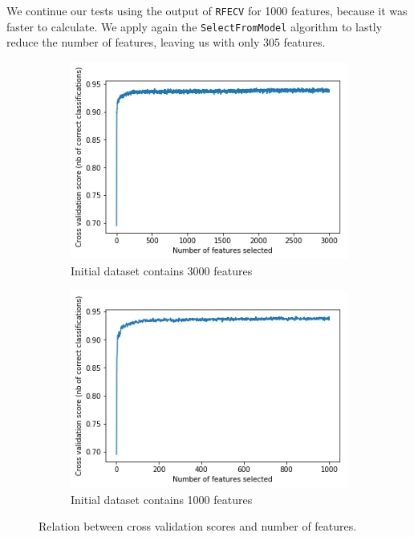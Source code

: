 We continue our tests using the output of \texttt{RFECV} for 1000 features, because it was faster to calculate. 
We apply again the \texttt{SelectFromModel} algorithm to lastly reduce the number of features, leaving us with only 305 features.

\begin{figure}[]
	\centering
	\begin{subfigure}[t]{0.48\textwidth}
		\centering
		\includegraphics[width=\linewidth]{rfecv-from3000.png}
		\caption{Initial dataset contains 3000 features}\label{fig:rfecv3000}		
	\end{subfigure}
	\begin{subfigure}[t]{0.48\textwidth}
		\centering
		\includegraphics[width=\linewidth]{rfecv1000.png}
		\caption{Initial dataset contains 1000 features}\label{fig:rfecv1000}
	\end{subfigure}
	\caption{Relation between cross validation scores and number of features.}\label{fig:rfecv}
\end{figure}

